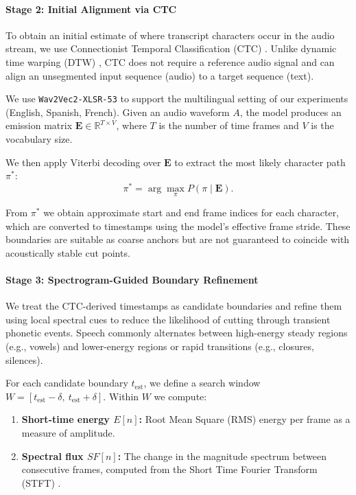 \paragraph{Stage 2: Initial Alignment via CTC}
To obtain an initial estimate of where transcript characters occur in the audio stream, we use Connectionist Temporal Classification (CTC) \parencite{graves2006connectionist}. Unlike dynamic time warping (DTW) \parencite{dwt}, CTC does not require a reference audio signal and can align an unsegmented input sequence (audio) to a target sequence (text).

We use \texttt{Wav2Vec2-XLSR-53} \parencite{baevski2020wav2vec} to support the multilingual setting of our experiments (English, Spanish, French). Given an audio waveform $A$, the model produces an emission matrix $\mathbf{E} \in \mathbb{R}^{T \times V}$, where $T$ is the number of time frames and $V$ is the vocabulary size.

We then apply Viterbi decoding over $\mathbf{E}$ to extract the most likely character path $\pi^*$:
\begin{equation}
    \pi^* = \arg\max_{\pi} P(\pi \mid \mathbf{E}) .
\end{equation}

From $\pi^*$ we obtain approximate start and end frame indices for each character, which are converted to timestamps using the model's effective frame stride. These boundaries are suitable as coarse anchors but are not guaranteed to coincide with acoustically stable cut points.

\paragraph{Stage 3: Spectrogram-Guided Boundary Refinement}
We treat the CTC-derived timestamps as candidate boundaries and refine them using local spectral cues to reduce the likelihood of cutting through transient phonetic events. Speech commonly alternates between high-energy steady regions (e.g., vowels) and lower-energy regions or rapid transitions (e.g., closures, silences).

For each candidate boundary $t_{\mathrm{est}}$, we define a search window $W = [t_{\mathrm{est}} - \delta,\ t_{\mathrm{est}} + \delta]$. Within $W$ we compute:
\begin{enumerate}
    \item \textbf{Short-time energy $E[n]$:} Root Mean Square (RMS) energy per frame as a measure of amplitude.
    \item \textbf{Spectral flux $SF[n]$:} The change in the magnitude spectrum between consecutive frames, computed from the Short Time Fourier Transform (STFT) \parencite{mcfee2015librosa}.
\end{enumerate}

